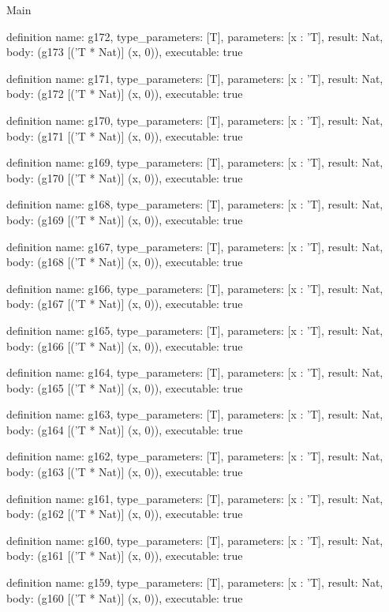 \begin{lexlean}{Main}
\begin{semanticmodule}
definition{
  name: g172,
  type_parameters: [T],
  parameters: [x : 'T],
  result: Nat,
  body: (g173 [('T * Nat)] (x, 0)),
  executable: true
}

definition{
  name: g171,
  type_parameters: [T],
  parameters: [x : 'T],
  result: Nat,
  body: (g172 [('T * Nat)] (x, 0)),
  executable: true
}

definition{
  name: g170,
  type_parameters: [T],
  parameters: [x : 'T],
  result: Nat,
  body: (g171 [('T * Nat)] (x, 0)),
  executable: true
}

definition{
  name: g169,
  type_parameters: [T],
  parameters: [x : 'T],
  result: Nat,
  body: (g170 [('T * Nat)] (x, 0)),
  executable: true
}

definition{
  name: g168,
  type_parameters: [T],
  parameters: [x : 'T],
  result: Nat,
  body: (g169 [('T * Nat)] (x, 0)),
  executable: true
}

definition{
  name: g167,
  type_parameters: [T],
  parameters: [x : 'T],
  result: Nat,
  body: (g168 [('T * Nat)] (x, 0)),
  executable: true
}

definition{
  name: g166,
  type_parameters: [T],
  parameters: [x : 'T],
  result: Nat,
  body: (g167 [('T * Nat)] (x, 0)),
  executable: true
}

definition{
  name: g165,
  type_parameters: [T],
  parameters: [x : 'T],
  result: Nat,
  body: (g166 [('T * Nat)] (x, 0)),
  executable: true
}

definition{
  name: g164,
  type_parameters: [T],
  parameters: [x : 'T],
  result: Nat,
  body: (g165 [('T * Nat)] (x, 0)),
  executable: true
}

definition{
  name: g163,
  type_parameters: [T],
  parameters: [x : 'T],
  result: Nat,
  body: (g164 [('T * Nat)] (x, 0)),
  executable: true
}

definition{
  name: g162,
  type_parameters: [T],
  parameters: [x : 'T],
  result: Nat,
  body: (g163 [('T * Nat)] (x, 0)),
  executable: true
}

definition{
  name: g161,
  type_parameters: [T],
  parameters: [x : 'T],
  result: Nat,
  body: (g162 [('T * Nat)] (x, 0)),
  executable: true
}

definition{
  name: g160,
  type_parameters: [T],
  parameters: [x : 'T],
  result: Nat,
  body: (g161 [('T * Nat)] (x, 0)),
  executable: true
}

definition{
  name: g159,
  type_parameters: [T],
  parameters: [x : 'T],
  result: Nat,
  body: (g160 [('T * Nat)] (x, 0)),
  executable: true
}


\end{semanticmodule}
\end{lexlean}
